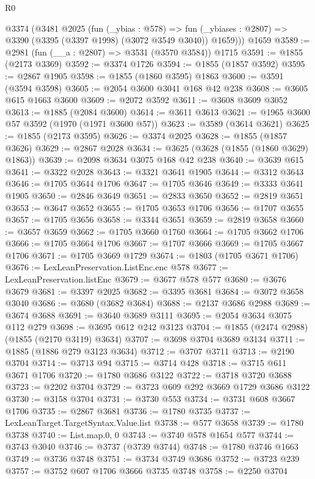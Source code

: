 \begin{lexlean}{R0}
\begin{coremodule}
  @3374
    (@3481
      @2025
      (fun (_ybias : @578) =>
      fun (_ybiases : @2807) => @3390 (@3395 (@3397 @1998) (@3072 @3549 @3040)) @1659)))
    @1659
@3589 := @2981 (fun (__a : @2807) => @3531 (@3570 @3584)) @1715
@3591 := @1855 (@2173 @3369)
@3592 := @3374 @1726
@3594 := @1855 (@1857 @3592)
@3595 := @2867 @1905
@3598 := @1855 (@1860 @3595) @1863
@3600 := @3591 (@3594 @3598)
@3605 := @2054 @3600 @3041 @168 @42 @238
@3608 := @3605 @615 @1663 @3600
@3609 := @2072 @3592
@3611 := @3608 @3609 @3052
@3613 := @1885 (@2084 @3600)
@3614 := @3611 @3613
@3621 := @1965 @3600 @57 @3592 (@1970 (@1971 @3600 @57))
@3623 := @3589 (@3614 @3621)
@3625 := @1855 (@2173 @3595)
@3626 := @3374 @2025
@3628 := @1855 (@1857 @3626)
@3629 := @2867 @2028
@3634 := @3625 (@3628 (@1855 (@1860 @3629) @1863))
@3639 := @2098 @3634 @3075 @168 @42 @238
@3640 := @3639 @615
@3641 := @3322 @2028
@3643 := @3321 @3641 @1905
@3644 := @3312 @3643
@3646 := @1705 @3644 @1706
@3647 := @1705 @3646
@3649 := @3333 @3641 @1905
@3650 := @2846 @3649
@3651 := @2833 @3650
@3652 := @2819 @3651
@3653 := @3647 @3652
@3655 := @1705 @3653 @1706
@3656 := @1707 @3655
@3657 := @1705 @3656
@3658 := @3344 @3651
@3659 := @2819 @3658
@3660 := @3657 @3659
@3662 := @1705 @3660 @1760
@3664 := @1705 @3662 @1706
@3666 := @1705 @3664 @1706
@3667 := @1707 @3666
@3669 := @1705 @3667 @1706
@3671 := @1705 @3669 @1729
@3674 := @1803 (@1705 @3671 @1706)
@3676 := LexLeanPreservation.ListEnc.enc @578
@3677 := LexLeanPreservation.listEnc
@3679 := @3677 @578 @577
@3680 := @3676 @3679
@3681 := @3397 @2025
@3682 := @3395 @3681
@3684 := @3072 @3658 @3040
@3686 := @3680 (@3682 @3684)
@3688 := @2137 @3686 @2988
@3689 := @3674 @3688
@3691 := @3640 @3689 @3111
@3695 := @2054 @3634 @3075 @112 @279
@3698 := @3695 @612 @242 @3123
@3704 := @1855 (@2474 @2988) (@1855 (@2170 @3119) @3634)
@3707 := @3698 @3704 @3689 @3134
@3711 := @1885 (@1886 @279 @3123 @3634)
@3712 := @3707 @3711
@3713 := @2190 @3704
@3714 := @3713 @94
@3715 := @3714 @428
@3718 := @3715 @611 @3671 @1706
@3720 := @1780 @3686 @3122
@3722 := @3718 @3720 @3688
@3723 := @2202 @3704
@3729 := @3723 @609 @292 @3669 @1729 @3686 @3122
@3730 := @3158 @3704
@3731 := @3730 @553
@3734 := @3731 @608 @3667 @1706
@3735 := @2867 @3681
@3736 := @1780 @3735
@3737 := LexLeanTarget.TargetSyntax.Value.list
@3738 := @577 @3658
@3739 := @1780 @3738
@3740 := List.map.{0, 0}
@3743 := @3740 @578 @1654 @577
@3744 := @3743 @3040
@3746 := @3737 (@3739 @3744)
@3748 := @1780 @3746 @1663
@3749 := @3736 @3748
@3751 := @3734 @3749 @3686
@3752 := @3723 @239
@3757 := @3752 @607 @1706 @3666 @3735 @3748
@3758 := @2250 @3704

\end{coremodule}
\end{lexlean}
